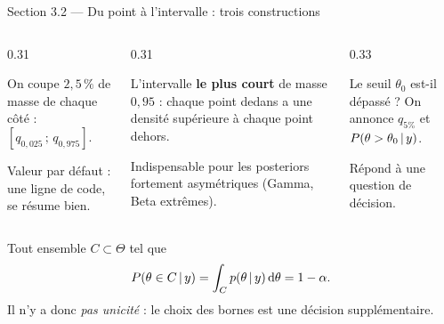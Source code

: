 \begin{frame}{Section 3.2 --- Du point à l'intervalle : trois constructions}
\small
\vspace{-1mm}
\begin{columns}[t]
\begin{column}{0.31\textwidth}
\begin{ebox}
On coupe $2{,}5\,\%$ de masse de chaque côté :
$[q_{0{,}025}\,;\,q_{0{,}975}]$.

\vspace{1mm}\footnotesize Valeur par défaut : une ligne de code, se résume bien.
\end{ebox}
\end{column}
\begin{column}{0.31\textwidth}
\begin{ebox}
L'intervalle \textbf{le plus court} de masse $0{,}95$ : chaque point dedans a une
densité supérieure à chaque point dehors.

\vspace{1mm}\footnotesize Indispensable pour les posteriors fortement asymétriques
(Gamma, Beta extrêmes).
\end{ebox}
\end{column}
\begin{column}{0.33\textwidth}
\begin{ebox}[3. Unilatéral]
\scriptsize
Le seuil $\theta_0$ est-il dépassé ? On annonce
$q_{5\%}$ et $P(\theta > \theta_0 \,\vert\, y)$.

\vspace{1mm} Répond à une question de décision.
\end{ebox}
\end{column}
\end{columns}
\vspace{-0.5mm}
\begin{kbox}
Tout ensemble $C \subset \Theta$ tel que
\[
P(\theta \in C \,\vert\, y) = \int_C p(\theta \,\vert\, y)\,\mathrm{d}\theta = 1-\alpha .
\]
Il n'y a donc \emph{pas unicité} : le choix des bornes est une décision
supplémentaire.
\end{kbox}
\end{frame}

